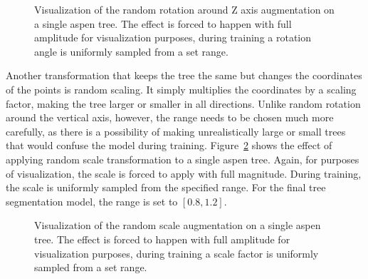 \begin{figure}
\caption[Visualization of the random rotation around Z axis augmentation on a single aspen tree.]{\label{fig-random-rotate-effect}Visualization of the random
rotation around Z axis augmentation on a single aspen tree. The effect
is forced to happen with full amplitude for visualization purposes,
during training a rotation angle is uniformly sampled from a set range.}
\end{figure}%

Another transformation that keeps the tree the same but changes the coordinates of the points is random scaling.
It simply multiplies the coordinates by a scaling factor, making the tree larger or smaller in all directions.
Unlike random rotation around the vertical axis, however, the range needs to be chosen much more carefully, as there is a possibility of making unrealistically large or small trees that would confuse the model during training.
Figure~\ref{fig-random-scale-effect} shows the effect of applying random scale transformation to a single aspen tree.
Again, for purposes of visualization, the scale is forced to apply with full magnitude.
During training, the scale is uniformly sampled from the specified range.
For the final tree segmentation model, the range is set to $[0.8, 1.2]$.

\begin{figure}
\caption[Visualization of the random scale augmentation on a single aspen tree.]{\label{fig-random-scale-effect}Visualization of the random
scale augmentation on a single aspen tree. The effect is forced to
happen with full amplitude for visualization purposes, during training a
scale factor is uniformly sampled from a set range.}
\end{figure}

